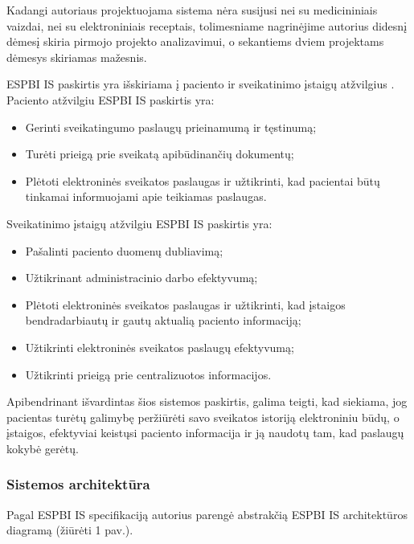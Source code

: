 Kadangi autoriaus projektuojama sistema nėra susijusi nei su medicininiais vaizdai, nei su elektroniniais receptais, tolimesniame nagrinėjime autorius didesnį dėmesį skiria pirmojo projekto analizavimui, o sekantiems dviem projektams dėmesys skiriamas mažesnis.


ESPBI IS paskirtis yra išskiriama į paciento ir sveikatinimo įstaigų atžvilgius \cite{Specifikacija}. Paciento atžvilgiu ESPBI IS paskirtis yra:
\begin{itemize}
    \item Gerinti sveikatingumo paslaugų prieinamumą ir tęstinumą;
    \item Turėti prieigą prie sveikatą apibūdinančių dokumentų;
    \item Plėtoti elektroninės sveikatos paslaugas ir užtikrinti, kad pacientai būtų tinkamai informuojami apie teikiamas paslaugas.
\end{itemize}


Sveikatinimo įstaigų atžvilgiu ESPBI IS paskirtis yra:
\begin{itemize}
    \item Pašalinti paciento duomenų dubliavimą;
    \item Užtikrinant administracinio darbo efektyvumą;
    \item Plėtoti elektroninės sveikatos paslaugas ir užtikrinti, kad įstaigos bendradarbiautų ir gautų aktualią paciento informaciją;
    \item Užtikrinti elektroninės sveikatos paslaugų efektyvumą;
    \item Užtikrinti prieigą prie centralizuotos informacijos.
\end{itemize}

Apibendrinant išvardintas šios sistemos paskirtis, galima teigti, kad siekiama, jog pacientas turėtų galimybę peržiūrėti savo sveikatos istoriją elektroniniu būdų, o įstaigos, efektyviai keistųsi paciento informacija ir ją naudotų tam, kad paslaugų kokybė gerėtų.

\subsubsection{Sistemos architektūra}

Pagal ESPBI IS specifikaciją \cite{Specifikacija} autorius parengė abstrakčią ESPBI IS architektūros diagramą (žiūrėti 1 pav.). 

